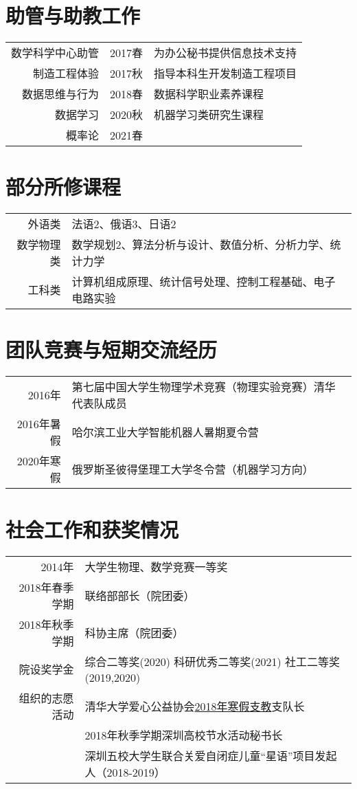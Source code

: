 \documentclass[12pt]{moderncv}
\begin{document}
\section{助管与助教工作}
\begin{tabular}{rll}
    数学科学中心助管 & 2017春 & 为办公秘书提供信息技术支持 \\
    制造工程体验   & 2017秋 & 指导本科生开发制造工程项目\\
    数据思维与行为 & 2018春 & 数据科学职业素养课程\\
    数据学习 &  2020秋 & 机器学习类研究生课程 \\
    概率论 &   2021春 & 
\end{tabular}
\section{部分所修课程}
\begin{tabular}{rl}
    外语类 & 法语2、俄语3、日语2 \\
    数学物理类 & 数学规划2、算法分析与设计、数值分析、分析力学、统计力学\\
    工科类 & 计算机组成原理、统计信号处理、控制工程基础、电子电路实验
\end{tabular}
\section{团队竞赛与短期交流经历}
\begin{tabular}{rl}
    2016年 & 第七届中国大学生物理学术竞赛（物理实验竞赛）清华代表队成员\\
    2016年暑假 & 哈尔滨工业大学智能机器人暑期夏令营 \\
    2020年寒假 & 俄罗斯圣彼得堡理工大学冬令营（机器学习方向）
\end{tabular}

\section{社会工作和获奖情况}

\begin{tabular}{rl}
2014年 & 大学生物理、数学竞赛一等奖 \\
2018年春季学期  & 联络部部长（院团委）\\
2018年秋季学期 & 科协主席（院团委） \\
院设奖学金 & 综合二等奖(2020) 科研优秀二等奖(2021) 社工二等奖 (2019,2020)\\
组织的志愿活动 & 清华大学爱心公益协会\href{http://leidenschaft.cn/volunteer0}{2018年寒假支教}支队长 \\
& 2018年秋季学期深圳高校节水活动秘书长 \\
& 深圳五校大学生联合关爱自闭症儿童“星语”项目发起人（2018-2019）
\end{tabular}
\end{document}
